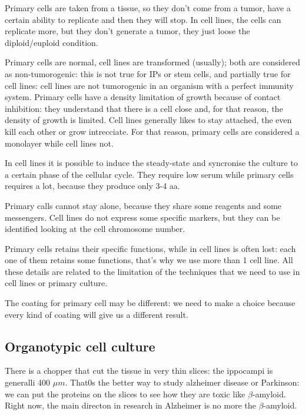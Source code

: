 \documentclass[a4paper, 12pt]{book}
\begin{document}
Primary cells are taken from a tissue, so they don't come from a tumor, have a certain ability to replicate and then they will stop. In cell lines, the cells can replicate more, but they don't generate a tumor, they just loose the diploid/euploid condition. 

Primary cells are normal, cell lines are transformed (usually); both are considered as non-tumorogenic: this is not true for IPs or stem cells, and partially true for cell lines: cell lines are not tumorogenic in an organism with a perfect immunity system. Primary cells have a density limitation of growth because of contact inhibition: they understand that there is a cell close and, for that reason, the density of growth is limited. Cell lines generally likes to stay attached, the even kill each other or grow intrecciate. For that reason, primary cells are considered a monolayer while cell lines not.  

In cell lines it is possible to induce the steady-state and syncronise the culture to a certain phase of the cellular cycle. They require low serum while primary cells requires a lot, because they produce only 3-4 aa.

Primary calls cannot stay alone, because they share some reagents and some messengers. Cell lines do not express some specific markers, but they can be identified looking at the cell chromosome number.

Primary cells retains their specific functions, while in cell lines is often lost: each one of them retains some functions, that's why we use more than 1 cell line. All these details are related to the limitation of the techniques that we need to use in cell lines or primary culture.

The coating for primary cell may be different: we need to make a choice because every kind of coating will give us a different result.


\subsection{Organotypic cell culture}
There is a chopper that cut the tissue in very thin slices: the ippocampi is generalli 400 $\mu m$. That0s the better way to study alzheimer disease or Parkinson: we can put the proteins on the slices to see how they are toxic like $\beta$-amyloid. Right now, the main directon in  research in Alzheimer is no more the $\beta$-amyloid.
\end{document}
